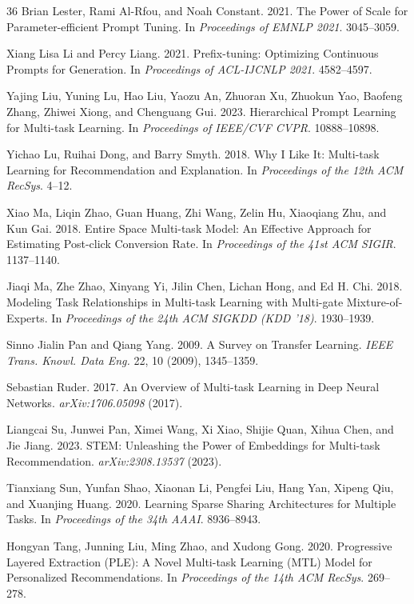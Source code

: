 \documentclass[review,anonymous]{acmart}
\begin{document}
\begin{thebibliography}{36}
Brian Lester, Rami Al-Rfou, and Noah Constant. 2021. The Power of Scale for
Parameter-efficient Prompt Tuning.
In \emph{Proceedings of EMNLP 2021}. 3045--3059.

Xiang Lisa Li and Percy Liang. 2021. Prefix-tuning: Optimizing Continuous
Prompts for Generation.
In \emph{Proceedings of ACL-IJCNLP 2021}. 4582--4597.

Yajing Liu, Yuning Lu, Hao Liu, Yaozu An, Zhuoran Xu, Zhuokun Yao, Baofeng Zhang,
Zhiwei Xiong, and Chenguang Gui. 2023. Hierarchical Prompt Learning for
Multi-task Learning. In \emph{Proceedings of IEEE/CVF CVPR}. 10888--10898.

Yichao Lu, Ruihai Dong, and Barry Smyth. 2018. Why I Like It: Multi-task
Learning for Recommendation and Explanation.
In \emph{Proceedings of the 12th ACM RecSys}. 4--12.

Xiao Ma, Liqin Zhao, Guan Huang, Zhi Wang, Zelin Hu, Xiaoqiang Zhu, and Kun Gai.
2018. Entire Space Multi-task Model: An Effective Approach for Estimating
Post-click Conversion Rate. In \emph{Proceedings of the 41st ACM SIGIR}. 1137--1140.

Jiaqi Ma, Zhe Zhao, Xinyang Yi, Jilin Chen, Lichan Hong, and Ed H. Chi. 2018.
Modeling Task Relationships in Multi-task Learning with Multi-gate
Mixture-of-Experts. In \emph{Proceedings of the 24th ACM SIGKDD (KDD '18)}. 1930--1939.

Sinno Jialin Pan and Qiang Yang. 2009. A Survey on Transfer Learning.
\emph{IEEE Trans. Knowl. Data Eng.} 22, 10 (2009), 1345--1359.

Sebastian Ruder. 2017. An Overview of Multi-task Learning in Deep Neural
Networks. \emph{arXiv:1706.05098} (2017).

Liangcai Su, Junwei Pan, Ximei Wang, Xi Xiao, Shijie Quan, Xihua Chen, and
Jie Jiang. 2023. STEM: Unleashing the Power of Embeddings for Multi-task
Recommendation. \emph{arXiv:2308.13537} (2023).

Tianxiang Sun, Yunfan Shao, Xiaonan Li, Pengfei Liu, Hang Yan, Xipeng Qiu, and
Xuanjing Huang. 2020. Learning Sparse Sharing Architectures for Multiple Tasks.
In \emph{Proceedings of the 34th AAAI}. 8936--8943.

Hongyan Tang, Junning Liu, Ming Zhao, and Xudong Gong. 2020. Progressive
Layered Extraction (PLE): A Novel Multi-task Learning (MTL) Model for
Personalized Recommendations. In \emph{Proceedings of the 14th ACM RecSys}. 269--278.


\end{thebibliography}
\end{document}
